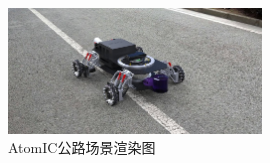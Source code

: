 \begin{figure}[htbp]
	\centering
	\includegraphics[width = 0.6\textwidth]{fig/jdgonglu.jpg}
	\caption{AtomIC公路场景渲染图}
	\label{jdgonglu}
\end{figure}



